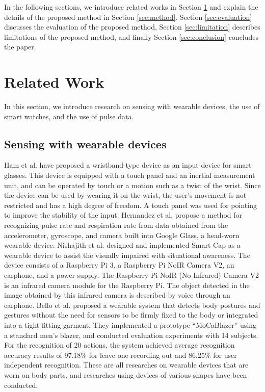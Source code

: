 \documentclass[sigchi,authordraft]{acmart}
\begin{document}
In the following sections, we introduce related works in Section \ref{sec:related} and explain the details of the proposed method in Section \ref{sec:method}. Section \ref{sec:evaluation} discusses the evaluation of the proposed method, Section \ref{sec:limitation} describes limitations of the proposed method, and finally Section \ref{sec:conclusion} concludes the paper.



\section{Related Work}
\label{sec:related}
In this section, we introduce research on sensing with wearable devices, the use of smart watches, and the use of pulse data.

\subsection{Sensing with wearable devices}
Ham et al. \cite{smart_wristband} have proposed a wristband-type device as an input device for smart glasses. This device is equipped with a touch panel and an inertial measurement unit, and can be operated by touch or a motion such as a twist of the wrist. Since the device can be used by wearing it on the wrist, the user's movement is not restricted and has a high degree of freedom. A touch panel was used for pointing to improve the stability of the input.
Hernandez et al. \cite{bioglass} propose a method for recognizing pulse rate and respiration rate from data obtained from the accelerometer, gyroscope, and camera built into Google Glass, a head-worn wearable device.
Nishajith et al. \cite{smart_cap} designed and implemented Smart Cap as a wearable device to assist the visually impaired with situational awareness. The device consists of a Raspberry Pi 3, a Raspberry Pi NoIR Camera V2, an earphone, and a power supply. The Raspberry Pi NoIR (No Infrared) Camera V2 is an infrared camera module for the Raspberry Pi. The object detected in the image obtained by this infrared camera is described by voice through an earphone.
Bello et al. \cite{MoCapaci} proposed a wearable system that detects body postures and gestures without the need for sensors to be firmly fixed to the body or integrated into a tight-fitting garment. They implemented a prototype ``MoCaBlazer'' using a standard men's blazer, and conducted evaluation experiments with 14 subjects. For the recognition of 20 actions, the system achieved average recognition accuracy results of 97.18\% for leave one recording out and 86.25\% for user independent recognition.
These are all researches on wearable devices that are worn on body parts, and researches using devices of various shapes have been conducted.\par
\end{document}
